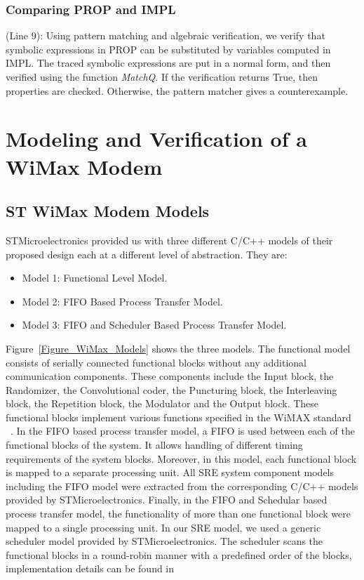 \documentclass[submission,copyright,creativecommons]{eptcs}
\begin{document}
\subsubsection{Comparing PROP and IMPL}

(Line 9): Using pattern matching and algebraic verification, we verify that symbolic expressions in PROP can be substituted by variables computed in IMPL. The traced symbolic expressions are put in a normal form, and then verified using the function \emph{MatchQ}. If the verification returns True, then properties are checked. Otherwise, the pattern matcher gives a counterexample.

\section{Modeling and Verification of a WiMax Modem}

\subsection{ST WiMax Modem Models}  \label{subsection_model}
STMicroelectronics provided us with three different C/C++ models of their proposed design each at a different level of abstraction. They are:
\begin{itemize}
  \item Model 1: Functional Level Model.
  \item Model 2: FIFO Based Process Transfer Model.
  \item Model 3: FIFO and Scheduler Based Process Transfer Model.
\end{itemize}

Figure~\ref{Figure_WiMax_Models} shows the three models. The functional model consists of serially connected functional blocks without any additional communication components. These components include the Input block, the Randomizer, the Convolutional coder, the Puncturing block, the Interleaving block, the Repetition block, the Modulator and the Output block. These functional blocks implement various functions specified in the WiMAX standard ~\cite{14}. In the FIFO based process transfer model, a FIFO is used between each of the functional blocks of the system. It allows handling of different timing requirements of the system blocks.  Moreover, in this model, each functional block is mapped to a separate processing unit. All SRE system component models including the FIFO model were extracted from the corresponding C/C++ models provided by STMicroelectronics. Finally, in the FIFO and Schedular based process transfer model, the functionality of more than one functional block were mapped to a single processing unit. In our SRE model, we used a generic scheduler model provided by STMicroelectronics. The scheduler scans the functional blocks in a round-robin manner with a predefined order of the blocks, implementation details can be found in~\cite{saleem_masters_thesis}
\end{document}
